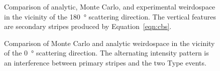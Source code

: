 \begin{figure}
\begin{center}
\end{center}
\caption{Comparison of analytic, Monte Carlo, and experimental weirdospace
in the vicinity of the \SI{180}{\degree} scattering direction.  The
vertical features are secondary stripes produced by Equation~\ref{eqn:cbs}.}
\label{fig:scat180degree}
\end{figure}

\begin{figure}
\centering
{}
\caption{Comparison of Monte Carlo and analytic weirdospace in the
vicinity of the \SI{0}{\degree} scattering direction.  The alternating
intensity pattern is an interference between primary stripes and the two
Type  events.}
\label{fig:scat0degree}
\end{figure}

